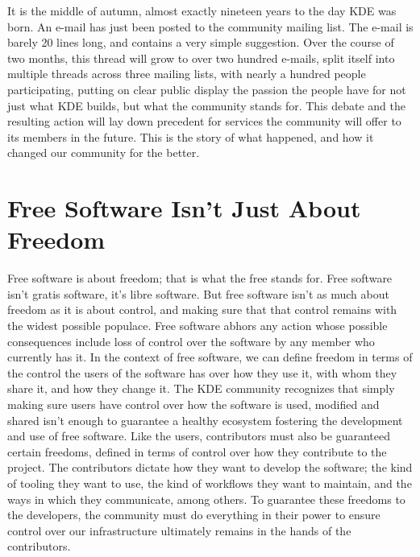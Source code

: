 

\noindent{}It is the middle of autumn, almost exactly nineteen years to the day KDE was born. An e-mail has just been posted to the community mailing list. The e-mail is barely 20 lines long, and contains a very simple suggestion. Over the course of two months, this thread will grow to over two hundred e-mails, split itself into multiple threads across three mailing lists, with nearly a hundred people participating, putting on clear public display the passion the people have for not just what KDE builds, but what the community stands for. This debate and the resulting action will lay down precedent for services the community will offer to its members in the future. This is the story of what happened, and how it changed our community for the better.

\section*{Free Software Isn't Just About Freedom}
Free software is about freedom; that is what the free stands for. Free software isn't gratis software, it's libre software. But free software isn't as much about freedom as it is about control, and making sure that that control remains with the widest possible populace. Free software abhors any action whose possible consequences include loss of control over the software by any member who currently has it. In the context of free software, we can define freedom in terms of the control the users of the software has over how they use it, with whom they share it, and how they change it.
The KDE community recognizes that simply making sure users have control over how the software is used, modified and shared isn't enough to guarantee a healthy ecosystem fostering the development and use of free software. Like the users, contributors must also be guaranteed certain freedoms, defined in terms of control over how they contribute to the project. The contributors dictate how they want to develop the software; the kind of tooling they want to use, the kind of workflows they want to maintain, and the ways in which they communicate, among others. To guarantee these freedoms to the developers, the community must do everything in their power to ensure control over our infrastructure ultimately remains in the hands of the contributors.

